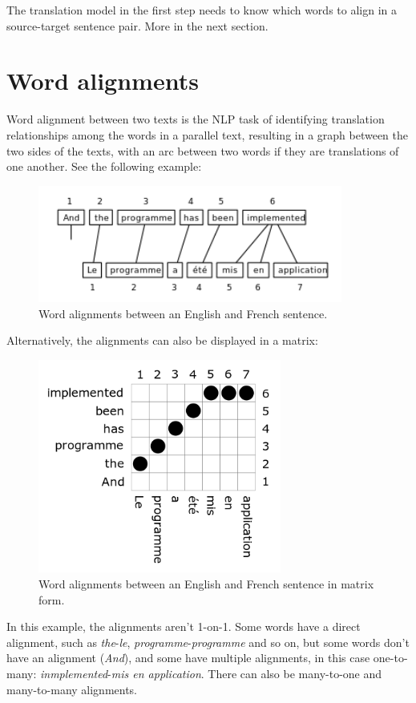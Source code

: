 The translation model in the first step needs to know which words to align in a source-target sentence pair. More in the next section.

\section{Word alignments}

Word alignment between two texts is the NLP task of identifying translation relationships among the words in a parallel text, resulting in a graph between the two sides of the texts, with an arc between two words if they are translations of one another. See the following example:

\begin{figure}[!ht]
    \centering
    \includegraphics[width=10cm]{figures/word_align.png}
    \caption{Word alignments between an English and French sentence.}
\end{figure}

Alternatively, the alignments can also be displayed in a matrix:

\begin{figure}[!ht]
    \centering
    \includegraphics[width=8cm]{figures/word_align_matrix.png}
    \caption{Word alignments between an English and French sentence in matrix form.}
\end{figure}

In this example, the alignments aren't 1-on-1. Some words have a direct alignment, such as \emph{the}-\emph{le}, \emph{programme}-\emph{programme} and so on, but some words don't have an alignment (\emph{And}), and some have multiple alignments, in this case one-to-many: \emph{inmplemented}-\emph{mis en application}. There can also be many-to-one and many-to-many alignments.

